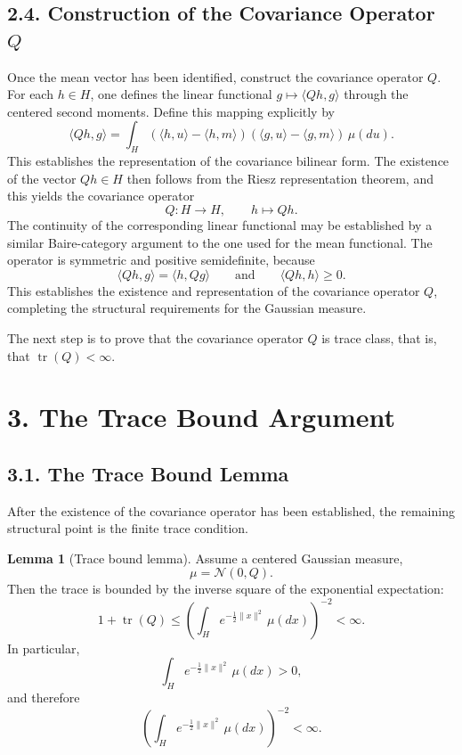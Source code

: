 \documentclass[11pt]{article}
\theoremstyle{definition}
\newtheorem{lemma}{Lemma}
\theoremstyle{remark}
\DeclareMathOperator{\tr}{tr}
\begin{document}
\subsection*{2.4. Construction of the Covariance Operator $Q$}
Once the mean vector has been identified, construct the covariance operator $Q$. For each \(h\in H\), one defines the linear functional \(g\mapsto \langle Qh,g\rangle\) through the centered second moments. Define this mapping explicitly by
\[
\langle Qh,g\rangle
=
\int_H (\langle h,u\rangle-\langle h,m\rangle)(\langle g,u\rangle-\langle g,m\rangle)\,\mu(du).
\]
This establishes the representation of the covariance bilinear form. The existence of the vector \(Qh\in H\) then follows from the Riesz representation theorem, and this yields the covariance operator
\[
Q:H\to H,
\qquad
h\mapsto Qh.
\]
The continuity of the corresponding linear functional may be established by a similar Baire-category argument to the one used for the mean functional.
The operator is symmetric and positive semidefinite, because
\[
\langle Qh,g\rangle=\langle h,Qg\rangle
\qquad \text{and} \qquad
\langle Qh,h\rangle\ge 0.
\]
This establishes the existence and representation of the covariance operator $Q$, completing the structural requirements for the Gaussian measure.

The next step is to prove that the covariance operator $Q$ is trace class, that is, that \(\tr(Q)<\infty\).

\section*{3. The Trace Bound Argument}

\subsection*{3.1. The Trace Bound Lemma}
After the existence of the covariance operator has been established, the remaining structural point is the finite trace condition.

\begin{lemma}[Trace bound lemma]
Assume a centered Gaussian measure,
\[
\mu=\mathcal N(0,Q).
\]
Then the trace is bounded by the inverse square of the exponential expectation:
\[
1+\tr(Q)\le \left(\int_H e^{-\frac{1}{2}\|x\|^2}\,\mu(dx)\right)^{-2}<\infty.
\]
In particular,
\[
\int_H e^{-\frac{1}{2}\|x\|^2}\,\mu(dx)>0,
\]
and therefore
\[
\left(\int_H e^{-\frac{1}{2}\|x\|^2}\,\mu(dx)\right)^{-2}<\infty.
\]
\end{lemma}
\end{document}
